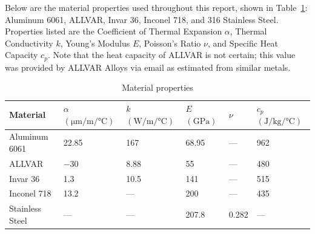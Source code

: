 \documentclass[12pt, letterpaper]{report}%
\begin{document}
\begin{appendices}
    Below are the material properties used throughout this report, shown in Table~\ref{tab:mat_props}:
    Aluminum 6061\cite{ref_NASA_specs_Al},
    ALLVAR\cite{ref_AllvarAlloys},
    Invar 36\cite{ref_Carpenter_Inv},
    Inconel 718\cite{ref_SpecialMetals_Inc}, and
    316 Stainless Steel\cite{ref_Ledbetter_Stainless}.
		Properties listed are the Coefficient of Thermal Expansion $\alpha$, Thermal Conductivity $k$, Young's Modulus $E$, Poisson's Ratio $\nu$, and Specific Heat Capacity $c_p$.
		Note that the heat capacity of ALLVAR is not certain; this value was provided by ALLVAR Alloys via email as estimated from similar metals.
		
		\begin{table}[H]
			\centering
			\caption{Material properties}
			\renewcommand{\arraystretch}{1.3}
			\begin{tabularx}{\textwidth}{
				>{\raggedright\arraybackslash}p{}
				>{\centering\arraybackslash}X
				>{\centering\arraybackslash}X
				>{\centering\arraybackslash}X
				>{\centering\arraybackslash}X
				>{\centering\arraybackslash}X
			}
			\toprule
			\textbf{Material} &
			\textbf{$\alpha$} $\left(\si{\micro\meter\per\meter\per\degreeCelsius}\right)$ &
			\textbf{$k$} $\left(\si{\watt\per\meter\per\degreeCelsius}\right)$ &
			\textbf{$E$} $\left(\si{\giga\pascal}\right)$ &
			\textbf{$\nu$} &
			\textbf{$c_p$} $\left(\si{\joule\per\kilogram\per\degreeCelsius}\right)$ \\
			\midrule

			Aluminum 6061
				& \num{22.85}
				& \num{167}
				& \num{68.95}
				& ---
				& \num{962} \\

			ALLVAR
				& \num{-30}
				& \num{8.88}
				& \num{55}
				& ---
				& \num{480} \\

			Invar 36
				& \num{1.3}
				& \num{10.5}
				& \num{141}
				& ---
				& \num{515} \\

			Inconel 718
				& \num{13.2}
				& ---
				& \num{200}
				& ---
				& \num{435} \\

			316 Stainless Steel
				& ---
				& ---
				& \num{207.8}
				& \num{0.282}
				& --- \\

			\bottomrule
			\end{tabularx}
			\label{tab:mat_props}
		\end{table}


\end{appendices}
\end{document}
